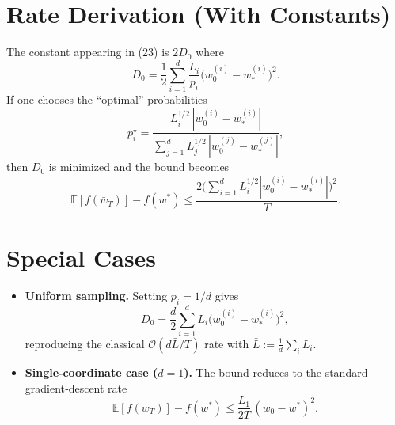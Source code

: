 \documentclass[11pt]{article}
\newcommand{\E}{\mathbb{E}}
\begin{document}
\section*{Rate Derivation (With Constants)}
The constant appearing in (23) is \(2D_{0}\) where
\[
    D_{0}= \frac12\sum_{i=1}^{d}\frac{L_{i}}{p_{i}}\bigl(w_{0}^{(i)}-w_{*}^{(i)}\bigr)^{2}.
\]
If one chooses the ``optimal'' probabilities
\[
    p_{i}^{\star}= \frac{L_{i}^{1/2}\,|w_{0}^{(i)}-w_{*}^{(i)}|}{\sum_{j=1}^{d}L_{j}^{1/2}\,|w_{0}^{(j)}-w_{*}^{(j)}|},
\tag{24}
\]
then \(D_{0}\) is minimized and the bound becomes
\[
    \E[f(\bar w_{T})]-f(w^{*})\le
    \frac{2\bigl(\sum_{i=1}^{d}L_{i}^{1/2}|w_{0}^{(i)}-w_{*}^{(i)}|\bigr)^{2}}{T}.
\]

\section*{Special Cases}
\begin{itemize}
    \item \textbf{Uniform sampling.} Setting \(p_{i}=1/d\) gives
    \[
        D_{0}= \frac{d}{2}\sum_{i=1}^{d}L_{i}\bigl(w_{0}^{(i)}-w_{*}^{(i)}\bigr)^{2},
    \]
    reproducing the classical \(\mathcal{O}(d\bar L/T)\) rate with \(\bar L:=\frac1d\sum_{i}L_{i}\).
    \item \textbf{Single‑coordinate case (\(d=1\)).} The bound reduces to the standard gradient‑descent rate
    \[
        \E[f(w_{T})]-f(w^{*})\le \frac{L_{1}}{2T}\,(w_{0}-w^{*})^{2}.
    \]
\end{itemize}
\end{document}
